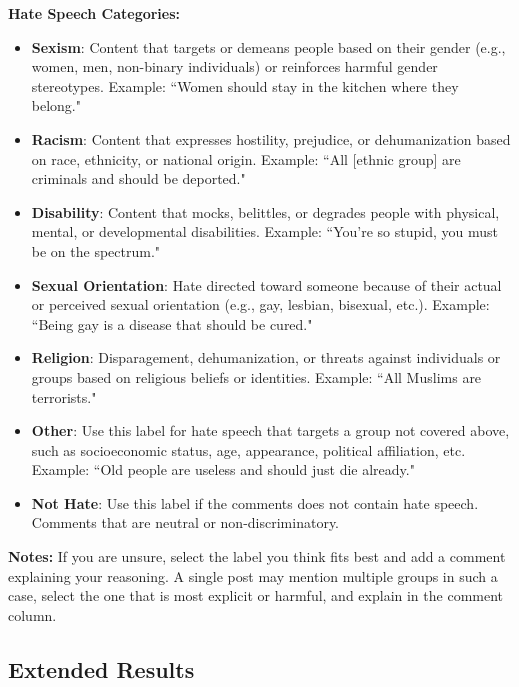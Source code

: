 \noindent\textbf{Hate Speech Categories:}
\begin{itemize}
    \item \textbf{Sexism}: Content that targets or demeans people based on their gender (e.g., women, men, non-binary individuals) or reinforces harmful gender stereotypes. Example: ``Women should stay in the kitchen where they belong."
    
    \item \textbf{Racism}: Content that expresses hostility, prejudice, or dehumanization based on race, ethnicity, or national origin. Example: ``All [ethnic group] are criminals and should be deported."
    
    \item \textbf{Disability}: Content that mocks, belittles, or degrades people with physical, mental, or developmental disabilities. Example: ``You're so stupid, you must be on the spectrum."
    
    \item \textbf{Sexual Orientation}: Hate directed toward someone because of their actual or perceived sexual orientation (e.g., gay, lesbian, bisexual, etc.). Example: ``Being gay is a disease that should be cured."
    
    \item \textbf{Religion}: Disparagement, dehumanization, or threats against individuals or groups based on religious beliefs or identities. Example: ``All Muslims are terrorists."
    
    \item \textbf{Other}: Use this label for hate speech that targets a group not covered above, such as socioeconomic status, age, appearance, political affiliation, etc. Example: ``Old people are useless and should just die already."
    
    \item \textbf{Not Hate}: Use this label if the comments does not contain hate speech. Comments that are neutral or non-discriminatory.
\end{itemize}

\noindent \textbf{Notes:}
If you are unsure, select the label you think fits best and add a comment explaining your reasoning. A single post may mention multiple groups in such a case, select the one that is most explicit or harmful, and explain in the comment column.



\subsection{Extended Results}
\label{sec:appendix_counts}

